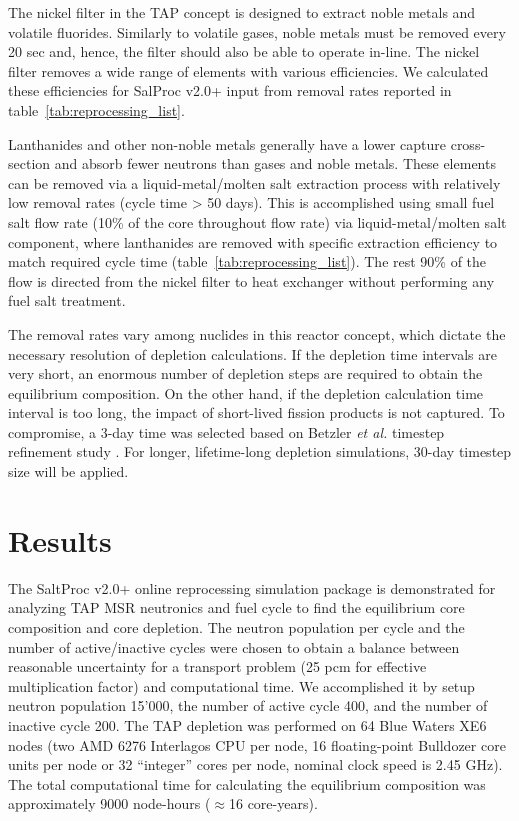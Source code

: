 \documentclass[12pt]{article} %
\begin{document}
The nickel filter in the \gls{TAP} concept is designed to extract noble metals and 
volatile fluorides. Similarly to volatile gases, noble metals must be removed 
every 20 sec and, hence, the filter should also be able to operate in-line. 
The nickel filter removes a wide range of elements with various 
efficiencies. We calculated these efficiencies for SalProc v2.0+ input 
from removal rates reported in table~\ref{tab:reprocessing_list}.

Lanthanides and other non-noble metals generally have a lower capture cross-section 
and absorb fewer neutrons than gases and noble metals. These elements can be removed 
via a liquid-metal/molten salt extraction process with relatively low removal rates 
(cycle time > 50 days). This is accomplished using small fuel salt flow rate (10\% 
of the core throughout flow rate) via liquid-metal/molten salt component, 
where lanthanides are 
removed with specific extraction efficiency to match required cycle time 
(table~\ref{tab:reprocessing_list}). The rest 90\% of the flow is directed 
from the nickel filter to heat exchanger without performing any fuel salt treatment.

The removal rates vary among nuclides in this reactor concept, which dictate the 
necessary resolution of depletion calculations. If the depletion time intervals 
are very short, an enormous number of depletion steps are required to obtain 
the equilibrium composition. On the other hand, if the depletion calculation time 
interval is too long, the impact of short-lived fission products is not captured. To compromise, a 3-day time was selected based on Betzler \emph{et al.} timestep 
refinement study \cite{betzler_assessment_2017}. For longer, lifetime-long 
depletion simulations, 30-day timestep size will be applied.

\section{Results}
The SaltProc v2.0+ online reprocessing simulation package is demonstrated for 
analyzing \gls{TAP} \gls{MSR} neutronics and fuel cycle to find the equilibrium core composition and core depletion. The neutron population per cycle and the number 
of active/inactive cycles were chosen to obtain a balance between reasonable 
uncertainty for a transport problem (25 pcm for effective multiplication factor) 
and computational time. We accomplished it by setup neutron population 15'000, 
the number of active cycle 400, and the number of inactive cycle 200. 
The \gls{TAP} depletion was performed on 64 Blue Waters 
XE6 nodes (two AMD 6276 Interlagos CPU per node, 16 floating-point Bulldozer 
core units per node or 32 ``integer'' cores per node, nominal clock speed is 
2.45 GHz). The total computational time for calculating the equilibrium 
composition was approximately 9000 node-hours ($\approx$16 core-years).
\end{document}
